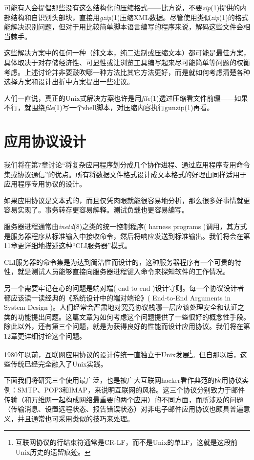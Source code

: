 \documentclass[12pt,oneside]{book}
\begin{document}
\begin{common-format}
可能有人会提倡那些没有这么结构化的压缩格式——比方说，不要\textit{zip}(1)提供的内部结构和自识别头部块，直接用\textit{gzip}(1)压缩XML数据。尽管使用类似\textit{zip}(1)的格式能解决识别问题，但对于用比较简单脚本语言编写的程序来说，解码这些文件会相当棘手。

这些解决方案中的任何一种（纯文本，纯二进制或压缩文本）都可能是最佳方案，具体取决于对存储经济性、可显性或让浏览工具编写起来尽可能简单等问题的权衡考虑。上述讨论并非要鼓吹哪一种方法比其它方法更好，而是就如何考虑清楚各种选择方案和设计出折中方案提出一些建议。

人们一直说，真正的Unix式解决方案也许是用\textit{file}(1)透过压缩看文件前缀——如果不行，就围绕\textit{file}(1)写一个shell脚本，对压缩内容执行gunzip(1)再看。


\section{应用协议设计}
我们将在第7章讨论“将复杂应用程序划分成几个协作进程、通过应用程序专用命令集或协议通信”的优点。所有将数据文件格式设计成文本格式的好理由同样适用于应用程序专用协议的设计。

如果应用协议是文本式的，而且仅凭肉眼就能很容易地分析，那么很多好事情就更容易实现了。事务转存更容易解释。测试负载也更容易编写。

服务器进程通常由\textit{inetd}(8)之类的统一控制程序( harness programs )调用，其方式是服务器程序从标准输入中接收命令，然后将响应发送到标准输出。我们将会在第11章更详细地描述这种“CLI服务器”模式。

CLI服务器的命令集是为达到简洁性而设计的，这种服务器程序有一个可贵的特性，就是测试人员能够直接向服务器进程键入命令来探知软件的工作情况。

另一个需要牢记在心的问题是端对端( end-to-end )设计守则。每一个协议设计者都应该读一读经典的《系统设计中的端对端论》( End-to-End Arguments in System Design )\cite{Saltzer}。人们经常会严肃地对究竟协议栈哪一层应该处理安全和认证之类的功能提出问题。这篇文章为如何考虑这个问题提供了一些很好的概念性手段。除此以外，还有第三个问题，就是为获得良好的性能而设计应用协议。我们将在第12章更详细讨论这个问题。

1980年以前，互联网应用协议的设计传统一直独立于Unix发展\footnote{互联网协议的行结束符通常是CR-LF，而不是Unix的单LF，这就是这段前Unix历史的遗留痕迹。}。但自那以后，这些传统已经完全融入了Unix实践。

下面我们将研究三个使用最广泛，也是被广大互联网hacker看作典范的应用协议实例：SMTP、POP3和IMAP，来说明互联网的风格。这三个协议分别致力于邮件传输（和万维网一起构成网络最重要的两个应用）的不同方面，而所涉及的问题（传输消息、设置远程状态、报告错误状态）对非电子邮件应用协议也颇具普遍意义，并且通常也可采用类似的技巧来处理。




\end{common-format}
\end{document}

